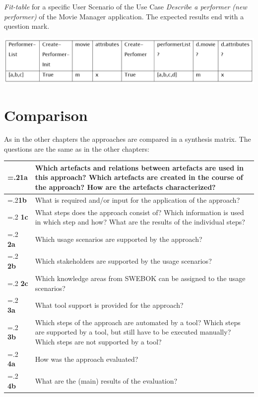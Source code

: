 \begin{table}[h!]
	\caption{\textit{Fit-table} for a specific User Scenario of the Use Case \textit{Describe a performer (new performer)} of the Movie Manager application. The expected results end with a question mark.}
	\centering
	\includegraphics[width=\textwidth]{../images/LongoFit.png}

	
	\label{fig:fit-longo}
\end{table}

\section{Comparison}
\label{sec:comparison}

As in the other chapters the approaches are compared in a synthesis matrix.
The questions are the same as in the other chapters:

\renewcommand{\arraystretch}{1.5}
	\begin{tabularx}{\textwidth}{>{\hsize=.2\hsize}X X}
  		\textbf{1a} & Which artefacts and relations between artefacts are used in this approach? Which
artefacts are created in the course of the approach? How are the artefacts characterized?
 \\
  		\hline
  		\textbf{1b} & What is required and/or input for the application of the approach? \\
  		\hline
  		\textbf{1c} & What steps does the approach consist of? Which information is used in which step
and how? What are the results of the individual steps?
 \\
  		\hline
  		\textbf{2a} & Which usage scenarios are supported by the approach? \\
  		\hline
  		\textbf{2b} & Which stakeholders are supported by the usage scenarios? \\
  		\hline
  		\textbf{2c} &  Which knowledge areas from SWEBOK can be assigned to the usage scenarios? \\
  		\hline
  		\textbf{3a} & What tool support is provided for the approach? \\
  		\hline
  		\textbf{3b} & Which steps of the approach are automated by a tool? Which steps are supported
by a tool, but still have to be executed manually? Which steps are not supported
by a tool?
 \\
  		\hline
  		\textbf{4a} & How was the approach evaluated? \\
  		\hline
  		\textbf{4b} & What are the (main) results of the evaluation? \\
  		\end{tabularx}
  		


